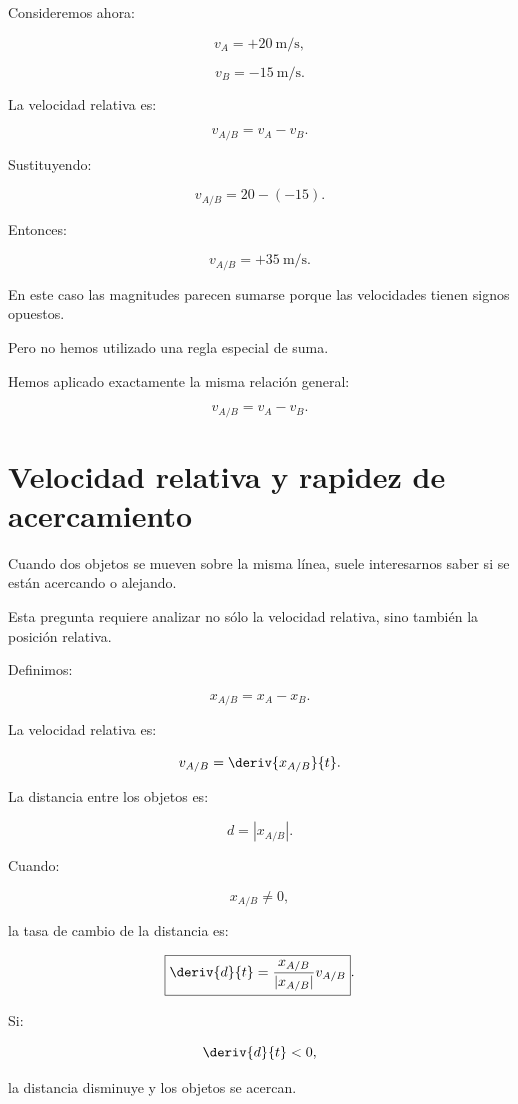 Consideremos ahora:

\[
v_A=+\SI{20}{\meter\per\second},
\]

\[
v_B=-\SI{15}{\meter\per\second}.
\]

La velocidad relativa es:

\[
v_{A/B}=v_A-v_B.
\]

Sustituyendo:

\[
v_{A/B}=20-(-15).
\]

Entonces:

\[
\boxed{
v_{A/B}=+\SI{35}{\meter\per\second}
}.
\]

\begin{interpretacion}

En este caso las magnitudes parecen sumarse porque las
velocidades tienen signos opuestos.

Pero no hemos utilizado una regla especial de suma.

Hemos aplicado exactamente la misma relación general:

\[
v_{A/B}=v_A-v_B.
\]

\end{interpretacion}


\section{Velocidad relativa y rapidez de acercamiento}

Cuando dos objetos se mueven sobre la misma línea, suele
interesarnos saber si se están acercando o alejando.

Esta pregunta requiere analizar no sólo la velocidad
relativa, sino también la posición relativa.

Definimos:

\[
x_{A/B}=x_A-x_B.
\]

La velocidad relativa es:

\[
v_{A/B}=\deriv{x_{A/B}}{t}.
\]

La distancia entre los objetos es:

\[
d=|x_{A/B}|.
\]

Cuando:

\[
x_{A/B}\neq0,
\]

la tasa de cambio de la distancia es:

\[
\boxed{
\deriv{d}{t}
=
\frac{x_{A/B}}{|x_{A/B}|}
v_{A/B}
}.
\]

Si:

\[
\deriv{d}{t}<0,
\]

la distancia disminuye y los objetos se acercan.

